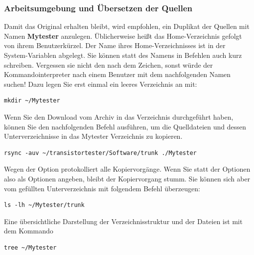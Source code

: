 \subsubsection{Arbeitsumgebung und Übersetzen der Quellen}
\label{sec:Arbeitsumgebung}
Damit das Original erhalten bleibt,
wird empfohlen, ein Duplikat der Quellen mit Namen \textbf {Mytester} anzulegen.
Üblicherweise heißt das Home-Verzeichnis  gefolgt von ihrem Benutzerkürzel.
Der Name ihres Home-Verzeichnisses ist in der System-Variablen  abgelegt.
Sie können statt des Namens in Befehlen auch kurz \lname{\textasciitilde/} schreiben.
Vergessen sie nicht den \lname{/} nach dem \lname{\textasciitilde} Zeichen, sonst würde der
Kommandointerpreter nach einem Benutzer mit dem nachfolgenden Namen suchen!
Dazu legen Sie erst einmal ein leeres Verzeichnis an mit:
\begin{large} \vspace{-0.4em} \begin{verbatim}
mkdir ~/Mytester
\end{verbatim} \end{large}
 \vspace{-0.5em} 
Wenn Sie den Download vom Archiv in das Verzeichnis   durchgeführt haben,
können Sie den nachfolgenden Befehl ausführen, um die Quelldateien und dessen Unterverzeichnisse
in das Mytester Verzeichnis zu kopieren.
\begin{large} \vspace{-0.4em} \begin{verbatim}
rsync -auv ~/transistortester/Software/trunk ./Mytester
\end{verbatim} \end{large}
 \vspace{-0.5em} 
Wegen der  Option protokolliert  alle Kopiervorgänge.
Wenn Sie statt der  Optionen also  als Optionen angeben,
bleibt der Kopiervorgang stumm.
Sie können sich aber vom gefüllten Unterverzeichnis mit folgendem Befehl
überzeugen:
\begin{large} \vspace{-0.4em} \begin{verbatim}
ls -lh ~/Mytester/trunk
\end{verbatim} \end{large}
 \vspace{-0.5em} 
Eine übersichtliche Darstellung der Verzeichnisstruktur und der Dateien ist mit dem Kommando
\begin{large} \vspace{-0.4em} \begin{verbatim}
tree ~/Mytester
\end{verbatim} \end{large}
